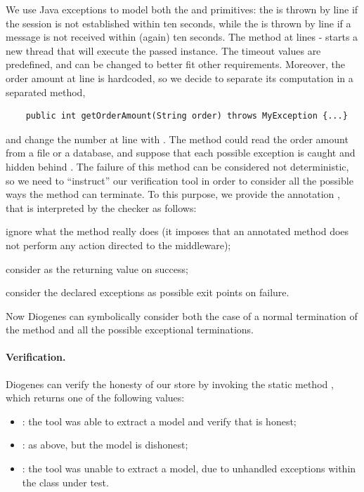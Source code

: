 We use Java exceptions to model both the  
and  primitives:
the  is thrown by line  if the session 
is not established within ten seconds, while the 
is thrown by line  if a message is not received within (again) ten seconds.
The  method at lines - starts a new 
thread that will execute the passed  instance.
%
The timeout values are predefined,
and can be changed to better fit other requirements.
Moreover, the order amount at line  is hardcoded, 
so we decide to separate its computation
in a separated method, \eg
\begin{mdframed}
  \begin{verbatim}
    public int getOrderAmount(String order) throws MyException {...}
  \end{verbatim}
\end{mdframed}
and change the number  at line  with .
The method could read the order amount from a file or a database,
and suppose that each possible exception
is caught and hidden behind . 
The failure of this method can be considered not deterministic,
so we need to ``instruct'' our verification tool
in order to consider all the possible ways the method can terminate.
% 
To this purpose, we provide the annotation , that
is interpreted by the checker as follows:
\begin{inlinelist}[noitemsep,topsep=0pt]
\item ignore what the method really does (it imposes that an annotated 
    method does not perform any action directed to the middleware);
\item consider  as the returning value on success;
\item consider the declared exceptions as possible exit points on failure.
\end{inlinelist}

Now Diogenes can symbolically consider both the case of a normal 
termination of the method
and all the possible exceptional terminations.

\paragraph{Verification.}
Diogenes can verify the honesty of our store 
by invoking the static method
,
which returns one of the following values:
\begin{itemize}[noitemsep,topsep=0pt]
\item {}: the tool was able to extract a \coco model and verify that is honest;
\item {}: as above, but the model is dishonest;
\item {}: the tool was unable to extract a model,
  \eg due to unhandled exceptions within the class under test.
\end{itemize}

